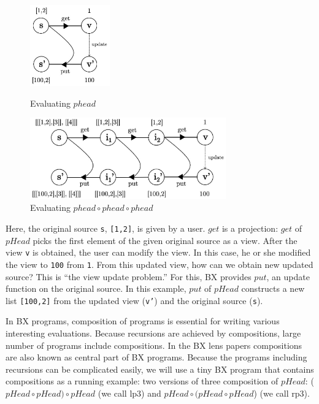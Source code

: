 \begin{figure}[!htb]
  \begin{minipage}{0.3\textwidth}
    \centering
    \includegraphics[height=3.5cm]{./fig/fig1.eps}
    \caption{Evaluating $phead$}
    \label{fig:eval-phead}
  \end{minipage}\hfill
  \begin{minipage}{0.7\textwidth}
    \centering
    \includegraphics[height=3.5cm]{./fig/fig2.eps}
    \caption{Evaluating $phead \circ phead \circ phead$}
    \label{fig:eval-comp-phead}
  \end{minipage}
\end{figure}

Here, the original source \texttt{s}, \texttt{[1,2]}, is given by a user. $get$ is a projection: $get$ of $pHead$ picks the first element of the given original source as a view.
After the view \texttt{v} is obtained, the user can modify the view.
In this case, he or she modified the view to \texttt{100} from \texttt{1}.
From this updated view, how can we obtain new updated source? This is ``the view update problem.'' For this, BX provides $put$, an update function on the original source.
In this example, $put$ of $pHead$ constructs a new list \texttt{[100,2]} from the updated view (\texttt{v'}) and the original source (\texttt{s}).

In BX programs, composition of programs is essential for writing various interesting evaluations. Because recursions are achieved by compositions, large number of programs include compositions.
In the BX lens papers \cite{} compositions are also known as central part of BX programs.
Because the programs including recursions can be complicated easily, we will use a tiny BX program that contains compositions as a running example: two versions of three composition of $pHead$: ($pHead \circ pHead) \circ pHead$ (we call lp3) and $pHead \circ (pHead \circ pHead$) (we call rp3).


